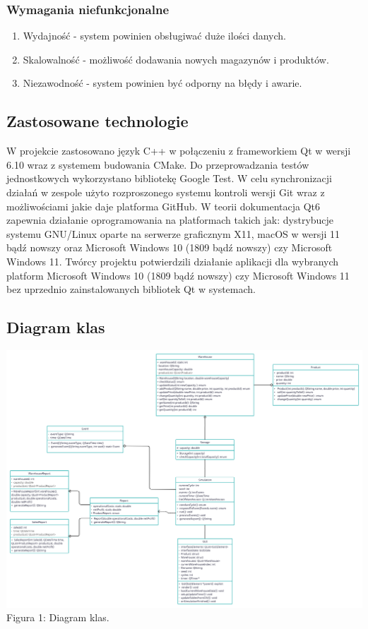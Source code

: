 \documentclass[11pt]{article}
\begin{document}
\subsubsection{Wymagania niefunkcjonalne}

\begin{enumerate}
    \item Wydajność - system powinien obsługiwać duże ilości danych.
    \item Skalowalność - możliwość dodawania nowych magazynów i produktów.
    \item Niezawodność - system powinien być odporny na błędy i awarie.
\end{enumerate}

\subsection{Zastosowane technologie}
W projekcie zastosowano język C++ w połączeniu z frameworkiem Qt w wersji 6.10 wraz z systemem budowania CMake. Do przeprowadzania testów jednostkowych wykorzystano bibliotekę Google Test. W celu synchronizacji działań w zespole użyto rozproszonego systemu kontroli wersji Git wraz z możliwościami jakie daje platforma GitHub. W teorii dokumentacja Qt6 zapewnia działanie oprogramowania na platformach takich jak: dystrybucje systemu GNU/Linux oparte na serwerze graficznym X11, macOS w wersji 11 bądź nowszy oraz Microsoft Windows 10 (1809 bądź nowszy) czy Microsoft Windows 11. Twórcy projektu potwierdzili działanie aplikacji dla wybranych platform Microsoft Windows 10 (1809 bądź nowszy) czy Microsoft Windows 11 bez uprzednio zainstalowanych bibliotek Qt w systemach.

\subsection{Diagram klas}

\begin{center}
    \includegraphics[scale=0.14]{Diagram klas.png}
    Figura 1: Diagram klas.
\end{center}
\end{document}
